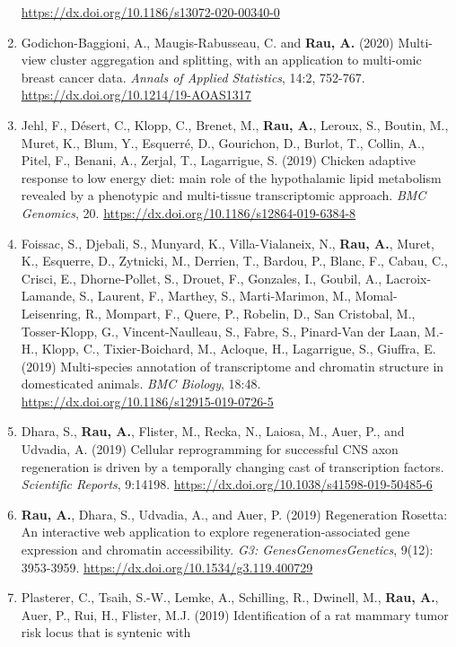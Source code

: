 \documentclass[11pt, a4paper]{awesome-cv}
\begin{document}
\begin{enumerate}
  \url{https://dx.doi.org/10.1186/s13072-020-00340-0}
\item
  Godichon-Baggioni, A., Maugis-Rabusseau, C. and \textbf{Rau, A.}
  (2020) Multi-view cluster aggregation and splitting, with an
  application to multi-omic breast cancer data. \emph{Annals of Applied
  Statistics}, 14:2, 752-767.
  \url{https://dx.doi.org/10.1214/19-AOAS1317}
\item
  Jehl, F., Désert, C., Klopp, C., Brenet, M., \textbf{Rau, A.}, Leroux,
  S., Boutin, M., Muret, K., Blum, Y., Esquerré, D., Gourichon, D.,
  Burlot, T., Collin, A., Pitel, F., Benani, A., Zerjal, T., Lagarrigue,
  S. (2019) Chicken adaptive response to low energy diet: main role of
  the hypothalamic lipid metabolism revealed by a phenotypic and
  multi-tissue transcriptomic approach. \emph{BMC Genomics}, 20.
  \url{https://dx.doi.org/10.1186/s12864-019-6384-8}
\item
  Foissac, S., Djebali, S., Munyard, K., Villa-Vialaneix, N.,
  \textbf{Rau, A.}, Muret, K., Esquerre, D., Zytnicki, M., Derrien, T.,
  Bardou, P., Blanc, F., Cabau, C., Crisci, E., Dhorne-Pollet, S.,
  Drouet, F., Gonzales, I., Goubil, A., Lacroix-Lamande, S., Laurent,
  F., Marthey, S., Marti-Marimon, M., Momal-Leisenring, R., Mompart, F.,
  Quere, P., Robelin, D., San Cristobal, M., Tosser-Klopp, G.,
  Vincent-Naulleau, S., Fabre, S., Pinard-Van der Laan, M.-H., Klopp,
  C., Tixier-Boichard, M., Acloque, H., Lagarrigue, S., Giuffra, E.
  (2019) Multi-species annotation of transcriptome and chromatin
  structure in domesticated animals. \emph{BMC Biology}, 18:48.
  \url{https://dx.doi.org/10.1186/s12915-019-0726-5}
\item
  Dhara, S., \textbf{Rau, A.}, Flister, M., Recka, N., Laiosa, M., Auer,
  P., and Udvadia, A. (2019) Cellular reprogramming for successful CNS
  axon regeneration is driven by a temporally changing cast of
  transcription factors. \emph{Scientific Reports}, 9:14198.
  \url{https://dx.doi.org/10.1038/s41598-019-50485-6}
\item
  \textbf{Rau, A.}, Dhara, S., Udvadia, A., and Auer, P. (2019)
  Regeneration Rosetta: An interactive web application to explore
  regeneration-associated gene expression and chromatin accessibility.
  \emph{G3: Genes\textbar Genomes\textbar Genetics}, 9(12): 3953-3959.
  \url{https://dx.doi.org/10.1534/g3.119.400729}
\item
  Plasterer, C., Tsaih, S.-W., Lemke, A., Schilling, R., Dwinell, M.,
  \textbf{Rau, A.}, Auer, P., Rui, H., Flister, M.J. (2019)
  Identification of a rat mammary tumor risk locus that is syntenic with

\end{enumerate}
\end{document}
